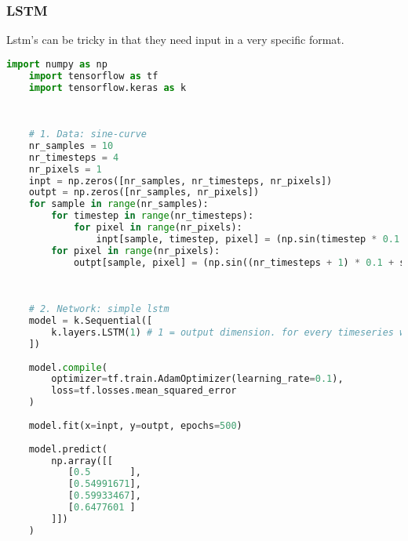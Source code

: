 \subsubsection{LSTM}
Lstm's can be tricky in that they need input in a very specific format.
\begin{lstlisting}[language=python]
    import numpy as np
    import tensorflow as tf
    import tensorflow.keras as k
    
    
    
    # 1. Data: sine-curve
    nr_samples = 10
    nr_timesteps = 4
    nr_pixels = 1
    inpt = np.zeros([nr_samples, nr_timesteps, nr_pixels])
    outpt = np.zeros([nr_samples, nr_pixels])
    for sample in range(nr_samples):
        for timestep in range(nr_timesteps):
            for pixel in range(nr_pixels):
                inpt[sample, timestep, pixel] = (np.sin(timestep * 0.1 + sample) + 1.0) / 2.0
        for pixel in range(nr_pixels):
            outpt[sample, pixel] = (np.sin((nr_timesteps + 1) * 0.1 + sample) + 1.0) / 2.0
        
    
    
    # 2. Network: simple lstm
    model = k.Sequential([
        k.layers.LSTM(1) # 1 = output dimension. for every timeseries we pass in, we want the one next value
    ])
    
    model.compile(
        optimizer=tf.train.AdamOptimizer(learning_rate=0.1),
        loss=tf.losses.mean_squared_error
    )
    
    model.fit(x=inpt, y=outpt, epochs=500)
    
    model.predict(
        np.array([[
           [0.5       ],
           [0.54991671],
           [0.59933467],
           [0.6477601 ]
        ]])
    )
    
\end{lstlisting}
